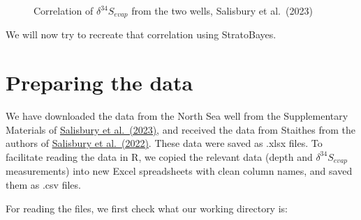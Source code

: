 \documentclass[
  letterpaper,
  DIV=11,
  numbers=noendperiod]{scrartcl}
\begin{document}
\begin{figure}[H]


\caption{\label{fig-2}Correlation of \(\delta^{34}S_{evap}\) from the
two wells, Salisbury et al.~(2023)}

\end{figure}%

We will now try to recreate that correlation using StratoBayes.

\section{Preparing the data}\label{preparing-the-data}

We have downloaded the data from the North Sea well from the
Supplementary Materials of
\href{https://doi.org/10.3389/feart.2023.1216365}{Salisbury et
al.~(2023)}, and received the data from Staithes from the authors of
\href{https://doi.org/10.1038/s41598-022-21542-4}{Salisbury et
al.~(2022)}. These data were saved as .xlsx files. To facilitate reading
the data in R, we copied the relevant data (depth and
\(\delta^{34}S_{evap}\) measurements) into new Excel spreadsheets with
clean column names, and saved them as .csv files.

For reading the files, we first check what our working directory is:
\end{document}
